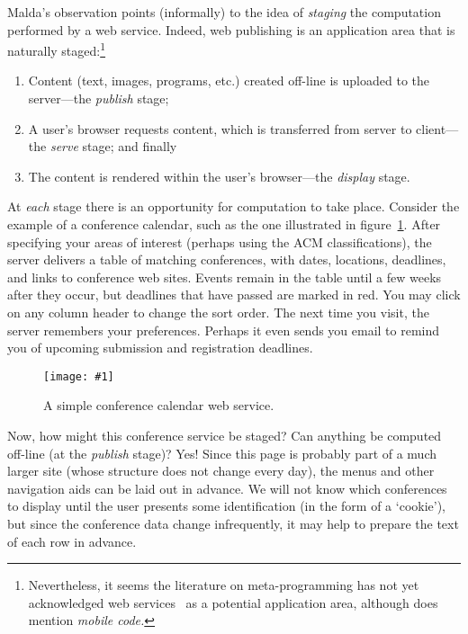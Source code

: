 \documentclass{elsart}
\newcommand{\myfig}[3]{%
  \begin{figure}[tbp]%
    #3%
    \caption{#2}%
    \label{fig:#1}%
  \end{figure}}
\newcommand{\screenshot}[2]{%
  \myfig{#1}{#2}
  {\centering%
    \texttt{[image: \#1]}}}
\begin{document}
Malda's observation points (informally) to the idea of \emph{staging}
the computation performed by a web service.  Indeed, web publishing is
an application area that is naturally staged:\footnote{Nevertheless,
  it seems the literature on meta-programming has not yet acknowledged
  web services~\cite{w3c-wsdl} as a potential application area,
  although \citet{sheard01accomp} does mention \emph{mobile code.}} %
\begin{enumerate}
\item Content (text, images, programs, etc.) created
  off-line is uploaded to the server---the \emph{publish}
  stage;
  
\item A user's browser requests content, which is
  transferred from server to client---the \emph{serve}
  stage; and finally
  
\item The content is rendered within the user's
  browser---the \emph{display} stage.
\end{enumerate}
At \emph{each} stage there is an opportunity for computation
to take place.  Consider the example of a conference
calendar, such as the one illustrated in
figure~\ref{fig:confcal}.  After specifying your areas of
interest (perhaps using the ACM classifications), the server
delivers a table of matching conferences, with dates,
locations, deadlines, and links to conference web sites.
Events remain in the table until a few weeks after they
occur, but deadlines that have passed are marked in red.
You may click on any column header to change the sort order.
The next time you visit, the server remembers your
preferences.  Perhaps it even sends you email to remind you
of upcoming submission and registration deadlines.

\screenshot{confcal}{A simple conference calendar web service.}

Now, how might this conference service be staged?  Can
anything be computed off-line (at the \emph{publish} stage)?
Yes!  Since this page is probably part of a much larger site
(whose structure does not change every day), the menus and
other navigation aids can be laid out in advance.  We will
not know which conferences to display until the user
presents some identification (in the form of a `cookie'),
but since the conference data change infrequently, it may
help to prepare the text of each row in advance.
\end{document}
